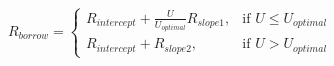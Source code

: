 \documentclass[preview]{standalone}
\begin{document}
\begin{align*}
R_{borrow} = \begin{cases} R_{intercept} + \frac{ U }{ U _{optimal}}R_{slope1}, & \text{if }  U  \leq  U _{optimal} &\\R_{intercept} + R_{slope2}, & \text{if }  U  >  U _{optimal}&\end{cases}
\end{align*}
\end{document}
